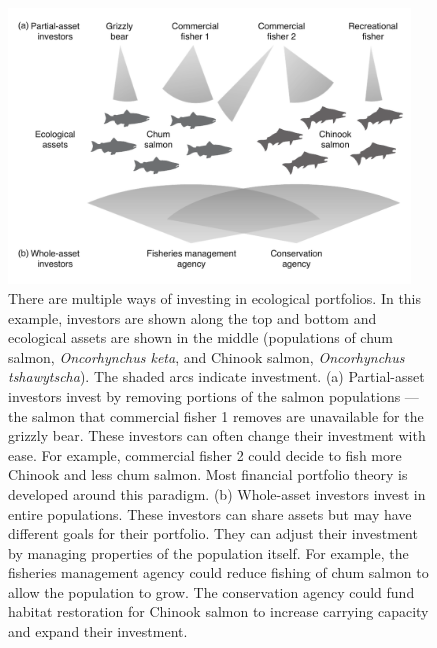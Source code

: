 \clearpage

\begin{figure}[htbp]
\centering
\includegraphics[width=4.2in]{salmon-portfolios-bw.pdf}
\caption{
There are multiple ways of investing in ecological portfolios. In this
example, investors are shown along the top and bottom and ecological assets
are shown in the middle (populations of chum salmon, \emph{Oncorhynchus keta},
and Chinook salmon, \emph{Oncorhynchus tshawytscha}). The shaded arcs indicate
investment. (a) Partial-asset investors invest by removing portions of the
salmon populations --- the salmon that commercial fisher 1 removes are
unavailable for the grizzly bear. These investors can often change their
investment with ease. For example, commercial fisher 2 could decide to fish
more Chinook and less chum salmon. Most financial portfolio theory is
developed around this paradigm. (b) Whole-asset investors invest in entire
populations. These investors can share assets but may have different goals for
their portfolio. They can adjust their investment by managing properties of
the population itself. For example, the fisheries management agency could
reduce fishing of chum salmon to allow the population to grow. The
conservation agency could fund habitat restoration for Chinook salmon to
increase carrying capacity and expand their investment.
}
\label{fig:salmonport}
\end{figure}

